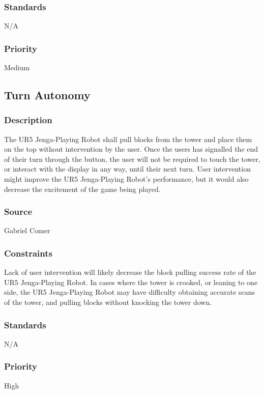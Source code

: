 \subsubsection{Standards}
N/A
\subsubsection{Priority}
Medium

\subsection{Turn Autonomy}
\subsubsection{Description}
The UR5 Jenga-Playing Robot shall pull blocks from the tower and place them on the top without intervention by the user. Once the users has signalled the end of their turn through the button, the user will not be required to touch the tower, or interact with the display in any way, until their next turn. User intervention might improve the UR5 Jenga-Playing Robot's performance, but it would also decrease the excitement of the game being played.
\subsubsection{Source}
Gabriel Comer%
\subsubsection{Constraints}
Lack of user intervention will likely decrease the block pulling success rate of the UR5 Jenga-Playing Robot. In cases where the tower is crooked, or leaning to one side, the UR5 Jenga-Playing Robot may have difficulty obtaining accurate scans of the tower, and pulling blocks without knocking the tower down.
\subsubsection{Standards}
N/A
\subsubsection{Priority}
High


